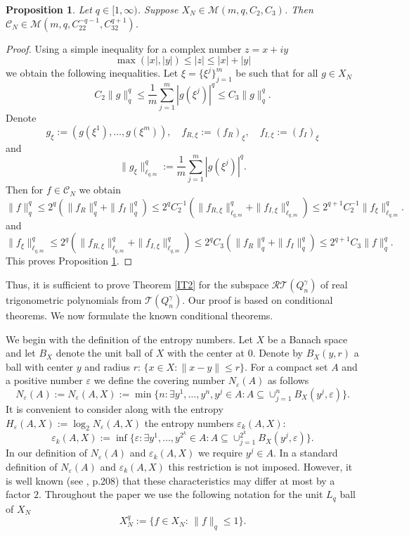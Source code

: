 \documentclass[12pt]{article}
\def\cC{{\mathcal C}}
\def \Tr{\mathcal T}
\def \cR{\mathcal R}
\def \cM{\mathcal M}
\def \e{\varepsilon}
\def\ga{\gamma}
\newtheorem{Proposition}{Proposition}[section]
\numberwithin{equation}{section}
\newcommand{\be}{\begin{equation}}
\newcommand{\ee}{\end{equation}}
\begin{document}
\begin{Proposition}\label{AP1} Let $q\in [1,\infty)$. Suppose $X_N\in \cM(m,q,C_2,C_3)$. 
Then $\cC_N \in \cM(m,q,C_22^{-q-1},C_32^{q+1})$.

\end{Proposition}
\begin{proof} Using a simple inequality for a complex number $z=x+iy$
$$
\max(|x|,|y|) \le |z| \le |x|+|y|
$$
we obtain the following inequalities. Let $\xi=\{\xi^j\}_{j=1}^m$ be such that for all $g\in X_N$
\be\label{A1}
C_2 \|g\|_q^q  \le \frac{1}{m} \sum_{j=1}^m |g(\xi^j)|^q \le C_3\|g\|_q^q.
\ee
Denote
$$
g_\xi := (g(\xi^1),\dots,g(\xi^m)),\quad f_{R,\xi} := (f_R)_\xi,\quad f_{I,\xi} := (f_I)_\xi
$$
and
$$
\|g_\xi\|_{\ell_{q,m}}^q :=  \frac{1}{m} \sum_{j=1}^m |g(\xi^j)|^q .
$$
Then for $f\in \cC_N$ we obtain
$$
\|f\|_q^q \le 2^q(\|f_R\|_q^q + \|f_I\|_q^q) \le 2^qC_2^{-1}(\|f_{R,\xi}\|_{\ell_{q,m}}^q + \|f_{I,\xi}\|_{\ell_{q,m}}^q) \le 2^{q+1}C_2^{-1}\|f_{\xi}\|_{\ell_{q,m}}^q.
$$
and
$$
\|f_{\xi}\|_{\ell_{q,m}}^q \le 2^q(\|f_{R,\xi}\|_{\ell_{q,m}}^q + \|f_{I,\xi}\|_{\ell_{q,m}}^q) \le 
2^qC_3(\|f_R\|_q^q +\|f_I\|_q^q) \le 2^{q+1}C_3\|f\|_q^q.
$$
This proves Proposition \ref{AP1}.
\end{proof}

Thus, it is sufficient to prove Theorem \ref{IT2} for the subspace $\cR\Tr(Q_n^\ga)$ of real trigonometric polynomials from $\Tr(Q_n^\ga)$. Our proof is based on conditional theorems. 
We now formulate the known conditional theorems.   

We begin with the definition of the entropy numbers.
  Let $X$ be a Banach space and let $B_X$ denote the unit ball of $X$ with the center at $0$. Denote by $B_X(y,r)$ a ball with center $y$ and radius $r$: $\{x\in X:\|x-y\|\le r\}$. For a compact set $A$ and a positive number $\e$ we define the covering number $N_\e(A)$
 as follows
$$
N_\e(A) := N_\e(A,X) 
:=\min \{n : \exists y^1,\dots,y^n, y^j\in A :A\subseteq \cup_{j=1}^n B_X(y^j,\e)\}.
$$
It is convenient to consider along with the entropy $H_\e(A,X):= \log_2 N_\e(A,X)$ the entropy numbers $\e_k(A,X)$:
$$
\e_k(A,X)  :=\inf \{\e : \exists y^1,\dots ,y^{2^k} \in A : A \subseteq \cup_{j=1}
^{2^k} B_X(y^j,\e)\}.
$$
In our definition of $N_\e(A)$ and $\e_k(A,X)$ we require $y^j\in A$. In a standard definition of $N_\e(A)$ and $\e_k(A,X)$ this restriction is not imposed. 
However, it is well known (see \cite{Tbook}, p.208) that these characteristics may differ at most by a factor $2$. Throughout the paper we use the following notation for the unit $L_q$ ball of $X_N$
$$
X_N^q:= \{f\in X_N:\, \|f\|_q \le 1\}.
$$
\end{document}

